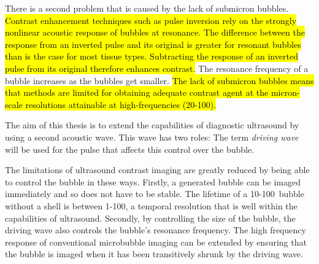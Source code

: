 There is a second problem that is caused by the lack of submicron bubbles.
\hl{Contrast enhancement techniques such as pulse inversion rely on the strongly nonlinear 
acoustic response of bubbles at resonance{\cite{Shen2005}}.
The difference between the response from an inverted pulse and its original is greater for resonant bubbles than is the case for most tissue types.
Subtracting the response of an inverted pulse from its original therefore enhances contrast.}
The resonance frequency of a bubble increases as the bubbles get smaller\cite{Zheng2006}.
\hl{The lack of submicron bubbles means that methods are limited for obtaining adequate contrast agent at the micron-scale resolutions attainable at high-frequencies (20-{\unit{100}\mega\hertz}).}

The aim of this thesis is to extend the capabilities of diagnostic ultrasound
by using a second acoustic wave.
This wave has two roles:
The term {\em driving wave} will be used for the pulse that affects this control over the bubble.

The limitations of ultrasound contrast imaging are greatly reduced
by being able to control the bubble in these ways.
Firstly, a generated bubble can be imaged immediately and so does not have to be stable.  
The lifetime of  a 10-\unit{100}\nano\metre\ bubble without a shell is between 1-\unit{100}\micro\second\cite{Ljunggren1997}, 
a temporal resolution that is well within the capabilities of ultrasound.
Secondly, by controlling the size of the bubble, 
the driving wave also controls the bubble's resonance frequency.
The high frequency response of conventional microbubble imaging 
can be extended by ensuring that the bubble is imaged 
when it has been transitively shrunk by the driving wave.


